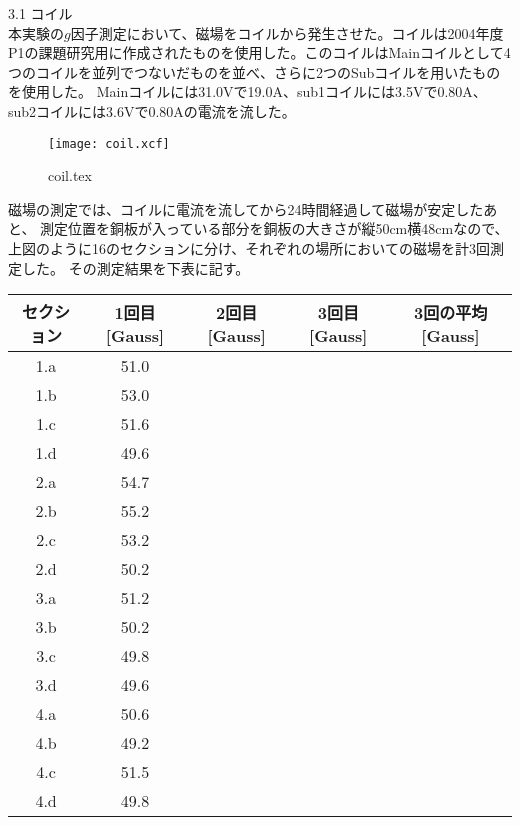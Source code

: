 3.1  コイル\\
  本実験の\(g\)因子測定において、磁場をコイルから発生させた。コイルは2004年度P1の課題研究用に作成されたものを使用した。このコイルはMainコイルとして4つのコイルを並列でつないだものを並べ、さらに2つのSubコイルを用いたものを使用した。
Mainコイルには31.0Vで19.0A、sub1コイルには3.5Vで0.80A、sub2コイルには3.6Vで0.80Aの電流を流した。
\begin{figure}[htbp]
 \begin{center}
  \texttt{[image: coil.xcf]}
  \caption[width=100mm]{coil.tex}
 \end{center}
\end{figure}
磁場の測定では、コイルに電流を流してから24時間経過して磁場が安定したあと、
測定位置を銅板が入っている部分を銅板の大きさが縦50cm横48cmなので、上図のように16のセクションに分け、それぞれの場所においての磁場を計3回測定した。
その測定結果を下表に記す。
\begin{center}
\begin{tabular}{c|ccc|c}\hline
  セクション&1回目[Gauss]&2回目[Gauss]&3回目[Gauss]&3回の平均[Gauss]\\ \hline
  1.a & 51.0 & & & \\
  1.b & 53.0 & & & \\
  1.c & 51.6 & & & \\
  1.d & 49.6 & & & \\
  2.a & 54.7 & & & \\
  2.b & 55.2 & & & \\
  2.c & 53.2 & & & \\
  2.d & 50.2 & & & \\
  3.a & 51.2 & & & \\
  3.b & 50.2 & & & \\
  3.c & 49.8 & & & \\
  3.d & 49.6 & & & \\
  4.a & 50.6 & & & \\
  4.b & 49.2 & & & \\
  4.c & 51.5 & & & \\
  4.d & 49.8 & & & \\
\end{tabular}
\end{center}
